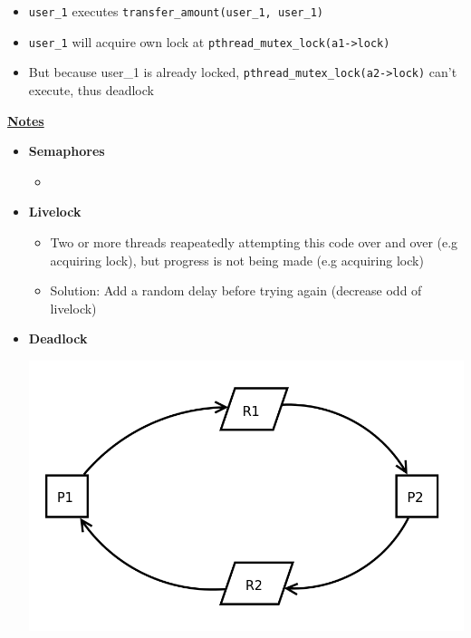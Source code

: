 \documentclass[12pt]{article}
\begin{document}
\begin{enumerate}[1.]
\begin{enumerate}[a)]
\begin{mdframed}
\begin{enumerate}[1.]
            \begin{itemize}
                \item \texttt{user\_1} executes \texttt{transfer\_amount(user\_1, user\_1)}
                \item \texttt{user\_1} will acquire own lock at \texttt{pthread\_mutex\_lock(a1->lock)}
                \item But because user\_1 is already locked, \texttt{pthread\_mutex\_lock(a2->lock)} can't execute,
                thus deadlock
            \end{itemize}
        \end{enumerate}
        \color{black}
        \end{mdframed}

        \bigskip

        \underline{\textbf{Notes}}

        \begin{itemize}
            \item \textbf{Semaphores}

            \begin{itemize}
                \item
            \end{itemize}

            \item \textbf{Livelock}

            \begin{itemize}
                \item Two or more threads reapeatedly attempting this code over and over (e.g acquiring lock), but progress is
                not being made (e.g acquiring lock)
                \item Solution: Add a random delay before trying again (decrease odd of livelock)
            \end{itemize}

            \item \textbf{Deadlock}

            \begin{center}
            \includegraphics[width=0.6\linewidth]{images/midterm_2_solution_11.png}
            \end{center}


\end{itemize}
\end{enumerate}
\end{enumerate}
\end{document}
